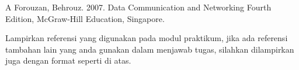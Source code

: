 \clearpage
{}
{\linespread{1}\fontsize{11}{13}\selectfont
 \setlength{\leftskip}{22mm}\setlength{\parindent}{-22mm}
 A Forouzan, Behrouz. 2007. Data Communication and Networking Fourth
 Edition, McGraw-Hill Education, Singapore.\par}
\vspace{24pt}
{\linespread{1}\fontsize{11}{13}\selectfont\raggedright
 Lampirkan referensi yang digunakan pada modul praktikum, jika ada referensi
 tambahan lain yang anda gunakan dalam menjawab tugas, silahkan dilampirkan
 juga dengan format seperti di atas.\par}

